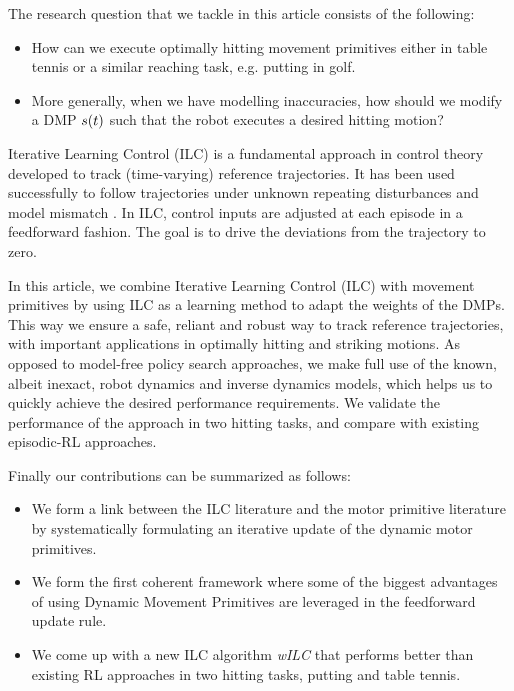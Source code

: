 The research question that we tackle in this article consists of the following:

\begin{itemize}
\item How can we execute optimally hitting movement primitives either in table tennis or a similar reaching task, e.g. putting in golf.

\item More generally, when we have modelling inaccuracies, how should we modify a DMP $s(t)$ such that the robot executes a desired hitting motion?
\end{itemize}

Iterative Learning Control (ILC) is a fundamental approach in control theory developed to track (time-varying) reference trajectories. It has been used successfully to follow trajectories under unknown repeating disturbances and model mismatch \cite{Bristow06}. In ILC, control inputs are adjusted at each episode in a feedforward fashion. The goal is to drive the deviations from the trajectory to zero. 

In this article, we combine Iterative Learning Control (ILC) with movement primitives by using ILC as a learning method to adapt the weights of the DMPs. This way we ensure a safe, reliant and robust way to track reference trajectories, with important applications in optimally hitting and striking motions. As opposed to model-free policy search approaches, we make full use of the known, albeit inexact, robot dynamics and inverse dynamics models, which helps us to quickly achieve the desired performance requirements. We validate the performance of the approach in two hitting tasks, and compare with existing episodic-RL approaches.

Finally our contributions can be summarized as follows:

\begin{itemize}
\item We form a link between the ILC literature and the motor primitive literature by systematically formulating an iterative update of the dynamic motor primitives.

\item We form the first coherent framework where some of the biggest advantages of using Dynamic Movement Primitives are leveraged in the feedforward update rule.

\item We come up with a new ILC algorithm \emph{wILC} that performs better than existing RL approaches in two hitting tasks, putting and table tennis.

\end{itemize}

